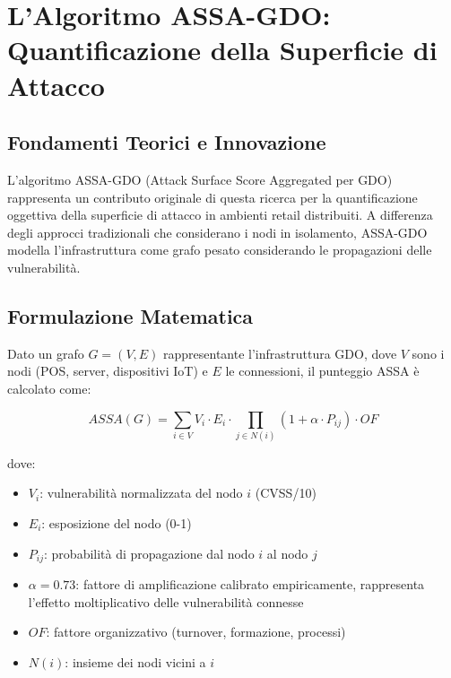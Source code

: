 

\section{\texorpdfstring{L'Algoritmo ASSA-GDO: Quantificazione della Superficie di Attacco}{2.4 - L'Algoritmo ASSA-GDO: Quantificazione della Superficie di Attacco}}

\subsection{\texorpdfstring{Fondamenti Teorici e Innovazione}{2.4.1 - Fondamenti Teorici e Innovazione}}

L'algoritmo ASSA-GDO (Attack Surface Score Aggregated per GDO) rappresenta un contributo originale di questa ricerca per la quantificazione oggettiva della superficie di attacco in ambienti retail distribuiti. A differenza degli approcci tradizionali che considerano i nodi in isolamento, ASSA-GDO modella l'infrastruttura come grafo pesato considerando le propagazioni delle vulnerabilità.

\subsection{\texorpdfstring{Formulazione Matematica}{2.4.2 - Formulazione Matematica}}

Dato un grafo $G = (V, E)$ rappresentante l'infrastruttura GDO, dove $V$ sono i nodi (POS, server, dispositivi IoT) e $E$ le connessioni, il punteggio ASSA è calcolato come:

\begin{equation}
ASSA(G) = \sum_{i \in V} V_i \cdot E_i \cdot \prod_{j \in N(i)} (1 + \alpha \cdot P_{ij}) \cdot OF
\end{equation}

dove:
\begin{itemize}
    \item $V_i$: vulnerabilità normalizzata del nodo $i$ (CVSS/10)
    \item $E_i$: esposizione del nodo (0-1)
    \item $P_{ij}$: probabilità di propagazione dal nodo $i$ al nodo $j$
    \item $\alpha = 0.73$: fattore di amplificazione calibrato empiricamente, rappresenta l'effetto moltiplicativo delle vulnerabilità connesse
    \item $OF$: fattore organizzativo (turnover, formazione, processi)
    \item $N(i)$: insieme dei nodi vicini a $i$
\end{itemize}

